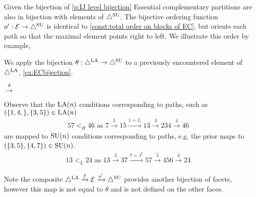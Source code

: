 Given the bijection of \cref{p:IJ level bijection} Essential complementary partitions are also in bijection with elements of $\triangle^{\mathrm{SU}}$. The bijective ordering function $o':\mathcal{E}\to \triangle^{\mathrm{SU}}$ is identical to \cref{const:total order on blocks of EC}, but orients each path so that the maximal element points right to left. We illustrate this order by example,
\begin{example}\label{ex:theta and path translation}
We apply the bijection $\theta:\triangle^{\mathrm{LA}}\to \triangle^{\mathrm{SU}}$ to a previously encountered element of $\triangle^{\mathrm{LA}}$, \cref{ex:ECbijection}.
\begin{center}
$
\xrightarrow{\theta}
$
\end{center}
Observe that the $\mathrm{LA}(n)$ conditions corresponding to paths, such as $( \{1,4,\},\{3,5\}) \in \mathrm{LA}(n)$
\begin{align*}
    57 <_R 46 \text{ as } 7 \xrightarrow{5} 15 \xrightarrow{1=I_*} 13 \xrightarrow{3} 234 \xrightarrow{4} 46
\end{align*}
are mapped to $\mathrm{SU}(n)$ conditions corresponding to paths, e.g. the prior maps to $( \{3,5 \},\{4,7\}) \in \mathrm{SU}(n)$.
\begin{align*}
    13 <_L 24 \text{ as } 13 \xrightarrow{3} 37 \xrightarrow{7=J^*} 57 \xrightarrow{5} 456 \xrightarrow{4} 24
\end{align*}

\end{example}
Note the composite $\triangle^{\mathrm{LA}} \xrightarrow{f} \mathcal{E} \xrightarrow{o'} \triangle^{\mathrm{SU}}$ provides another bijection of facets, however this map is not equal to $\theta$ and is not defined on the other faces.


